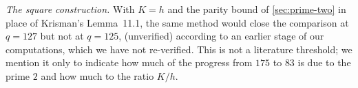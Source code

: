 \emph{The square construction.} With $K=h$ and the parity bound of \cref{sec:prime-two} in place
of Krisman's Lemma~11.1, the same method would close the comparison at $q=127$ but not at $q=125$,
(unverified) according to an earlier stage of our computations, which we have not re-verified.
This is not a literature threshold; we mention it only to indicate how much of the progress from
$175$ to $83$ is due to the prime $2$ and how much to the ratio $K/h$.

